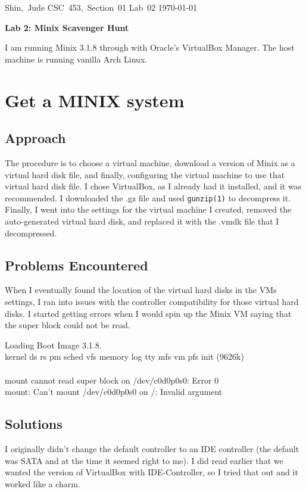 \documentclass[11pt]{article}
\begin{document}
\hfill\vbox{\hbox{Shin, Jude}
		\hbox{CSC 453, Section 01}	
		\hbox{Lab 02}	
		\hbox{\today}}\par

\bigskip
\centerline{\Large\bf Lab 2: {\sc Minix} Scavenger Hunt}\par
\bigskip
I am running {\sc Minix 3.1.8} through with Oracle's {\sc VirtualBox Manager}. The host machine is running vanilla {\sc Arch Linux}.

\setcounter{section}{0}
\section{Get a MINIX system}
\subsection{Approach}
The procedure is to choose a virtual machine, download a version of {\sc Minix} as a virtual hard disk file, and finally, configuring the virtual machine to use that virtual hard disk file. I chose {\sc VirtualBox}, as I already had it installed, and it was recommended. I downloaded the .gz file and used {\tt gunzip(1)} to decompress it. Finally, I went into the settings for the virtual machine I created, removed the auto-generated virtual hard disk, and replaced it with the .vmdk file that I decompressed. 

\subsection{Problems Encountered}
When I eventually found the location of the virtual hard disks in the VMs settings, I ran into issues with the controller compatibility for those virtual hard disks. I started getting errors when I would spin up the {\sc Minix} VM saying that the super block could not be read. 

{\tt\begin{tabbing}
Loading Boot Image 3.1.8.\\
kernel ds rs pm sched vfs memory log tty mfs vm pfs init (9626k)\\
\\
mount cannot read super block on /dev/c0d0p0s0: Error 0\\
mount: Can't mount /dev/c0d0p0s0 on /: Invalid argument\\
\end{tabbing}}

\subsection{Solutions}
I originally didn't change the default controller to an IDE controller (the default was SATA and at the time it seemed right to me). I did read earlier that we wanted the version of {\sc VirtualBox} with IDE-Controller, so I tried that out and it worked like a charm.
\end{document}

